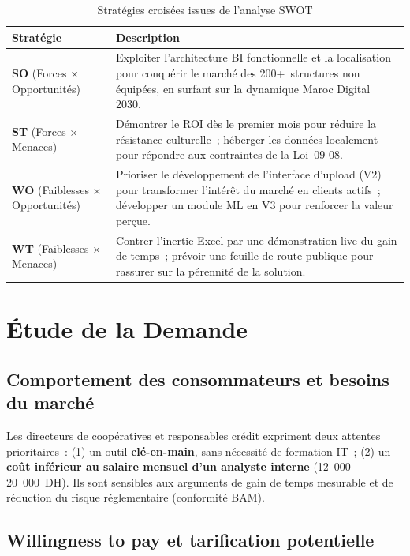 \documentclass[12pt, a4paper]{report}
\begin{document}
\begin{table}[H]
\centering
\caption{Stratégies croisées issues de l'analyse SWOT}
\label{tab:swot_strategies}
\renewcommand{\arraystretch}{1.4}
\begin{tabularx}{\textwidth}{p{3cm} X}
\toprule
\rowcolor{primary!12}
Stratégie & Description \\
\midrule
\textbf{SO} (Forces $\times$ Opportunités) & Exploiter l'architecture BI fonctionnelle et la localisation pour conquérir le marché des 200+~structures non équipées, en surfant sur la dynamique Maroc Digital 2030. \\
\textbf{ST} (Forces $\times$ Menaces) & Démontrer le ROI dès le premier mois pour réduire la résistance culturelle~; héberger les données localement pour répondre aux contraintes de la Loi~09-08. \\
\textbf{WO} (Faiblesses $\times$ Opportunités) & Prioriser le développement de l'interface d'upload (V2) pour transformer l'intérêt du marché en clients actifs~; développer un module ML en V3 pour renforcer la valeur perçue. \\
\textbf{WT} (Faiblesses $\times$ Menaces) & Contrer l'inertie Excel par une démonstration live du gain de temps~; prévoir une feuille de route publique pour rassurer sur la pérennité de la solution. \\
\bottomrule
\end{tabularx}
\end{table}

\section{Étude de la Demande}

\subsection{Comportement des consommateurs et besoins du marché}

Les directeurs de coopératives et responsables crédit expriment deux attentes
prioritaires~: (1) un outil \textbf{clé-en-main}, sans nécessité de formation IT~;
(2) un \textbf{coût inférieur au salaire mensuel d'un analyste interne}
(12~000--20~000~DH). Ils sont sensibles aux arguments de gain de temps mesurable
et de réduction du risque réglementaire (conformité BAM).

\subsection{Willingness to pay et tarification potentielle}
\end{document}
